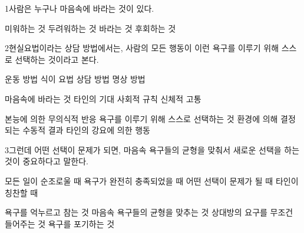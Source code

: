 \documentclass[fs85,seriesRus]{korfarm-base}
\begin{document}
\kfActivityBg \par{}
\par{}\par\nopagebreak[4]\smallskip\nopagebreak[4]
\kfBeginMC
\begin{kfSentenceUnit}{1}{사람은 누구나 마음속에 바라는 것이 있다.}
\begin{kfChoices}
\kfChoice 미워하는 것
\kfChoice 두려워하는 것
\kfChoice 바라는 것
\kfChoice 후회하는 것
\end{kfChoices}
\end{kfSentenceUnit}

\begin{kfSentenceUnit}{2}{현실요법이라는 상담 방법에서는, 사람의 모든 행동이 이런 욕구를 이루기 위해 스스로 선택하는 것이라고 본다.}
\begin{kfChoices}
\kfChoice 운동 방법
\kfChoice 식이 요법
\kfChoice 상담 방법
\kfChoice 명상 방법
\end{kfChoices}
\begin{kfChoices}
\kfChoice 마음속에 바라는 것
\kfChoice 타인의 기대
\kfChoice 사회적 규칙
\kfChoice 신체적 고통
\end{kfChoices}
\begin{kfChoices}
\kfChoice 본능에 의한 무의식적 반응
\kfChoice 욕구를 이루기 위해 스스로 선택하는 것
\kfChoice 환경에 의해 결정되는 수동적 결과
\kfChoice 타인의 강요에 의한 행동
\end{kfChoices}
\end{kfSentenceUnit}

\begin{kfSentenceUnit}{3}{그런데 어떤 선택이 문제가 되면, 마음속 욕구들의 균형을 맞춰서 새로운 선택을 하는 것이 중요하다고 말한다.}
\begin{kfChoices}
\kfChoice 모든 일이 순조로울 때
\kfChoice 욕구가 완전히 충족되었을 때
\kfChoice 어떤 선택이 문제가 될 때
\kfChoice 타인이 칭찬할 때
\end{kfChoices}
\begin{kfChoices}
\kfChoice 욕구를 억누르고 참는 것
\kfChoice 마음속 욕구들의 균형을 맞추는 것
\kfChoice 상대방의 요구를 무조건 들어주는 것
\kfChoice 욕구를 포기하는 것
\end{kfChoices}
\end{kfSentenceUnit}
\end{document}
